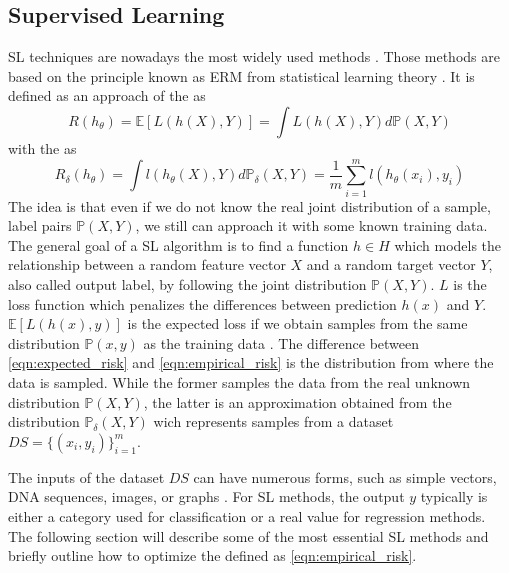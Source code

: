 \subsection{Supervised Learning}
\label{subsec:supervised_learning}
\acf{SL} techniques are nowadays the most widely used methods \cite{doi:10.1126/science.aaa8415}. Those methods are based on the principle known as \ac{ERM} from statistical learning theory \cite{NIPS1991_ff4d5fbb}. It is defined as an approach of the  as
\begin{equation}
    R(h_\theta)=\mathbb{E}[L(h(X),Y)]=\int L(h(X),Y) d\mathbb{P}(X,Y)
    \label{eqn:expected_risk}
\end{equation}
with the  as
\begin{equation}
    R_\delta(h_\theta)=\int l(h_\theta(X),Y)d \mathbb{P}_\delta(X,Y)=\frac{1}{m}\sum_{i=1}^m l(h_\theta(x_i),y_i)
    \label{eqn:empirical_risk}
\end{equation}
The idea is that even if we do not know the real joint distribution of a sample, label pairs $\mathbb{P}(X,Y)$, we still can approach it with some known training data. The general goal of a \ac{SL} algorithm is to find a function $h \in H$ which models the relationship between a random feature vector $X$ and a random target vector $Y$, also called output label, by following the joint distribution $\mathbb{P}(X,Y)$. $L$ is the loss function which penalizes the differences between prediction $h(x)$ and $Y$. $\mathbb{E}[L(h(x),y)]$ is the expected loss if we obtain samples from the same distribution $\mathbb{P}(x,y)$ as the training data \cite{DBLP:journals/corr/abs-1710-09412}. The difference between \ref{eqn:expected_risk} and \ref{eqn:empirical_risk} is the distribution from where the data is sampled. While the former samples the data from the real unknown distribution $\mathbb{P}(X,Y)$, the latter is an approximation obtained from the distribution $\mathbb{P}_\delta(X,Y)$ wich represents samples from a dataset $DS=\{(x_i,y_i)\}_{i=1}^m$.

The inputs of the dataset $DS$ can have numerous forms, such as simple vectors, DNA sequences, images, or graphs \cite{doi:10.1126/science.aaa8415}. For \ac{SL} methods, the output $y$ typically is either a category used for classification or a real value for regression methods. The following section will describe some of the most essential \ac{SL} methods and briefly outline how to optimize the  defined as \ref{eqn:empirical_risk}.


